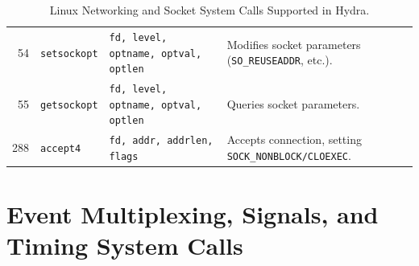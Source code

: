 \begin{table}[htbp]
\begin{tabularx}{\textwidth}{rllX}
54 & \texttt{setsockopt} & \texttt{fd, level, optname, optval, optlen} & Modifies socket parameters (\texttt{SO\_REUSEADDR}, etc.). \\
55 & \texttt{getsockopt} & \texttt{fd, level, optname, optval, optlen} & Queries socket parameters. \\
288 & \texttt{accept4} & \texttt{fd, addr, addrlen, flags} & Accepts connection, setting \texttt{SOCK\_NONBLOCK/CLOEXEC}. \\
\bottomrule
\end{tabularx}
\caption{Linux Networking and Socket System Calls Supported in Hydra.}
\label{tab:syscall_net}
\end{table}

\section{Event Multiplexing, Signals, and Timing System Calls}
\label{sec:ref_event_ops}

